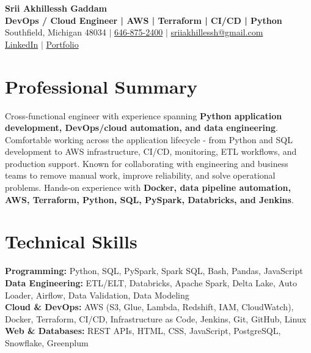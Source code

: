\documentclass[letterpaper,10pt]{article}
\begin{document}
\fontsize{9.35pt}{10.45pt}\selectfont

\begin{center}
    {\LARGE \textbf{Srii Akhillessh Gaddam}} \\[-1pt]
    \textbf{DevOps / Cloud Engineer | AWS | Terraform | CI/CD | Python} \\[2pt]
    Southfield, Michigan 48034 $|$
    \href{tel:6468752400}{646-875-2400} $|$
    \href{mailto:sriiakhillessh@gmail.com}{sriiakhillessh@gmail.com} \\[1pt]
    \href{https://www.linkedin.com/in/srii-akhiilessh-gaddam-b48668191/}{LinkedIn} $|$
    \href{https://sriiakhillesshg.github.io/portfolio/}{Portfolio}
\end{center}
\vspace{-8pt}

\section{Professional Summary}
\small{Cross-functional engineer with experience spanning \textbf{Python application development, DevOps/cloud automation, and data engineering}. Comfortable working across the application lifecycle - from Python and SQL development to AWS infrastructure, CI/CD, monitoring, ETL workflows, and production support. Known for collaborating with engineering and business teams to remove manual work, improve reliability, and solve operational problems. Hands-on experience with \textbf{Docker, data pipeline automation, AWS, Terraform, Python, SQL, PySpark, Databricks, and Jenkins}.}

\section{Technical Skills}
\small{
\textbf{Programming:} Python, SQL, PySpark, Spark SQL, Bash, Pandas, JavaScript \\
\textbf{Data Engineering:} ETL/ELT, Databricks, Apache Spark, Delta Lake, Auto Loader, Airflow, Data Validation, Data Modeling \\
\textbf{Cloud \& DevOps:} AWS (S3, Glue, Lambda, Redshift, IAM, CloudWatch), Docker, Terraform, CI/CD, Infrastructure as Code, Jenkins, Git, GitHub, Linux \\
\textbf{Web \& Databases:} REST APIs, HTML, CSS, JavaScript, PostgreSQL, Snowflake, Greenplum
}
\end{document}
